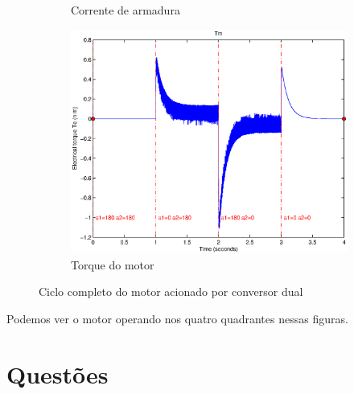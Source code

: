 \documentclass{article}
\begin{document}
\begin{figure}[H]
\begin{subfigure}[b]{0.49\linewidth}
		\caption{Corrente de armadura}
	\end{subfigure}
	\begin{subfigure}[b]{0.49\linewidth}
		\centering
		\includegraphics[width=\linewidth]{matlab/tm8}
		\caption{Torque do motor}
	\end{subfigure}
	\caption{Ciclo completo do motor acionado por conversor dual}
	\label{fig:res8}
\end{figure}
Podemos ver o motor operando nos quatro quadrantes nessas figuras.
\section{Questões}
\end{document}
